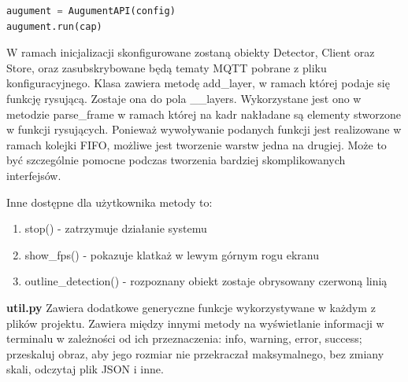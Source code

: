 \documentclass[12pt,twoside,polish]{article}
\begin{document}
\begin{lstlisting}[language=Python, label=aug, caption=Tworzenie oraz uruchomienie systemu AR]
augument = AugumentAPI(config)
augument.run(cap)
\end{lstlisting}

W ramach inicjalizacji skonfigurowane zostaną obiekty Detector, Client oraz Store, oraz zasubskrybowane będą tematy MQTT pobrane z pliku konfiguracyjnego. Klasa zawiera metodę add\_layer, w ramach której podaje się funkcję rysującą. Zostaje ona do pola \_\_layers. Wykorzystane jest ono w metodzie parse\_frame w ramach której na kadr nakładane są elementy stworzone w funkcji rysujących. Ponieważ wywoływanie podanych funkcji jest realizowane w ramach kolejki FIFO, możliwe jest tworzenie warstw jedna na drugiej. Może to być szczególnie pomocne podczas tworzenia bardziej skomplikowanych interfejsów.

Inne dostępne dla użytkownika metody to:
\begin{enumerate}[label=\alph*), leftmargin=1.25cm]
	\item stop() - zatrzymuje działanie systemu
	\item show\_fps() - pokazuje klatkaż w lewym górnym rogu ekranu
	\item outline\_detection() - rozpoznany obiekt zostaje obrysowany czerwoną linią
\end{enumerate}

\textbf{util.py}
Zawiera dodatkowe generyczne funkcje wykorzystywane w każdym z plików projektu. Zawiera między innymi metody na wyświetlanie informacji w terminalu w zależności od ich przeznaczenia: info, warning, error, success; przeskaluj obraz, aby jego rozmiar nie przekraczał maksymalnego, bez zmiany skali, odczytaj plik JSON i inne.
\end{document}
